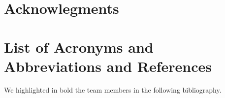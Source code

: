 \documentclass[letter]{ar-1col_WFIRST-HLS}
\begin{document}
\section*{Acknowlegments}
\label{sec:acknowledgments}


\section{List of Acronyms and Abbreviations and References}
\label{sec:acronyms}




\clearpage
\newpage


We highlighted in bold the team members in the following bibliography.




\clearpage
\newpage
\end{document}
